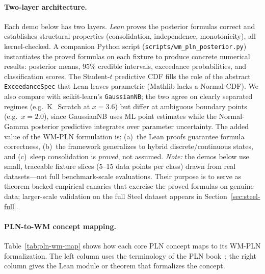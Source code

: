 \documentclass[11pt,openany]{report}
\begin{document}
\paragraph{Two-layer architecture.}
\label{sec:two-layer}
Each demo below has two layers.
\emph{Lean} proves the posterior formulas correct and establishes
structural properties (consolidation, independence, monotonicity),
all kernel-checked.  A companion Python script
(\texttt{scripts/wm\_pln\_posterior.py}) instantiates the proved
formulas on each fixture to produce concrete numerical results:
posterior means, 95\% credible intervals, exceedance probabilities,
and classification scores.  The Student-$t$ predictive CDF fills the
role of the abstract \texttt{ExceedanceSpec} that Lean leaves parametric
(Mathlib lacks a Normal CDF).  We also compare with scikit-learn's
\texttt{GaussianNB}; the two agree on clearly separated regimes
(e.g.\ K\_Scratch at $x=3.6$) but differ at ambiguous boundary
points (e.g.\ $x=2.0$), since GaussianNB uses ML point estimates
while the Normal-Gamma posterior predictive integrates over parameter
uncertainty.  The added value of the WM-PLN formulation is:
(a)~the Lean proofs guarantee formula correctness,
(b)~the framework generalizes to hybrid discrete/continuous states, and
(c)~sleep consolidation is \emph{proved}, not assumed.
\emph{Note:} the demos below use small, traceable fixture slices
(5--15 data points per class) drawn from real datasets---not
full benchmark-scale evaluations.  Their purpose is to serve as
theorem-backed empirical canaries that exercise the proved formulas
on genuine data; larger-scale validation on the full Steel dataset
appears in Section~\ref{sec:steel-full}.

\paragraph{PLN-to-WM concept mapping.}
\label{sec:pln-wm-map}
Table~\ref{tab:pln-wm-map} shows how each core PLN concept maps to
its WM-PLN formalization.  The left column uses the terminology of
the PLN book~\cite{goertzel2009pln}; the right column gives the Lean
module or theorem that formalizes the concept.
\end{document}

